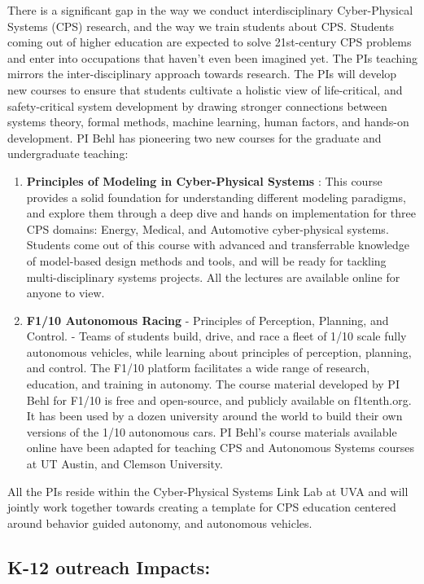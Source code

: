 There is a significant gap in the way we conduct interdisciplinary Cyber-Physical Systems (CPS) research, and the way we train students about CPS. Students coming out of higher education are expected to solve 21st-century CPS problems and enter into occupations that haven’t even been imagined yet. The PIs teaching mirrors the inter-disciplinary approach towards research. 
The PIs will develop new courses to ensure that students cultivate a holistic view of life-critical, and safety-critical system development by drawing stronger connections between systems theory, formal methods, machine learning, human factors, and hands-on development.
PI Behl has pioneering two new courses for the graduate and undergraduate teaching:
\begin{enumerate}
    \item \textbf{Principles of Modeling in Cyber-Physical Systems} : This course provides a solid foundation for understanding different modeling paradigms, and explore them through a deep dive and hands on implementation for three CPS domains: Energy, Medical, and Automotive cyber-physical systems. Students come out of this course with advanced and transferrable knowledge of model-based design methods and tools, and will be ready for tackling multi-disciplinary systems projects. All the lectures are available online for anyone to view. 
    \item \textbf{F1/10 Autonomous Racing} - Principles of Perception, Planning, and Control. - Teams of students build, drive, and race a fleet of 1/10 scale fully autonomous vehicles, while learning about principles of perception, planning, and control. The F1/10 platform facilitates a wide range of research, education, and training in autonomy. The course material developed by PI Behl for F1/10 is free and open-source, and publicly available on f1tenth.org. It has been used by a dozen university around the world to build their own versions of the 1/10 autonomous cars. PI Behl's course materials available online have been adapted for teaching CPS and Autonomous Systems courses at UT Austin, and Clemson University.
\end{enumerate}

All the PIs reside within the Cyber-Physical Systems Link Lab at UVA and will jointly work together towards creating a template for CPS education centered around behavior guided autonomy, and autonomous vehicles. 

\subsection{K-12 outreach Impacts:}

